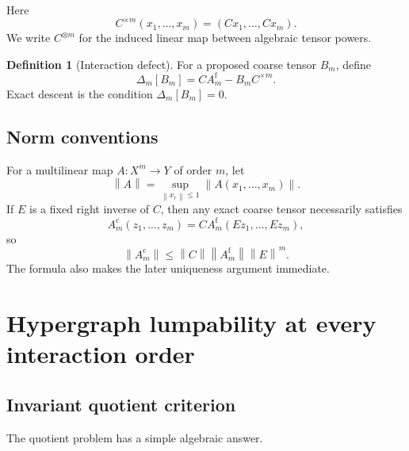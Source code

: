 \documentclass[11pt]{article}
\theoremstyle{definition}
\newtheorem{definition}[theorem]{Definition}
\theoremstyle{remark}
\newcommand{\norm}[1]{\left\lVert #1\right\rVert}
\newcommand{\fine}{\mathrm f}
\newcommand{\coarse}{\mathrm c}
\begin{document}
Here
\[
  C^{\times m}(x_1,\ldots,x_m)
  =(Cx_1,\ldots,Cx_m).
\]
We write $C^{\otimes m}$ for the induced linear map between algebraic tensor powers.

\begin{definition}[Interaction defect]\label{def:interaction-defect}
For a proposed coarse tensor $B_m$, define
\begin{equation}\label{eq:interaction-defect}
  \Delta_m[B_m]
  =
  CA_m^{\fine}-B_mC^{\times m}.
\end{equation}
Exact descent is the condition $\Delta_m[B_m]=0$.
\end{definition}

\subsection{Norm conventions}
For a multilinear map $A:X^m\to Y$ of order $m$, let
\[
  \norm{A}
  =
  \sup_{\norm{x_r}\leq1}
  \norm{A(x_1,\ldots,x_m)}.
\]
If $E$ is a fixed right inverse of $C$, then any exact coarse tensor necessarily satisfies
\begin{equation}\label{eq:coarse-tensor-bound-preview}
  A_m^{\coarse}(z_1,\ldots,z_m)
  =
  CA_m^{\fine}(Ez_1,\ldots,Ez_m),
\end{equation}
so
\[
  \norm{A_m^{\coarse}}
  \leq
  \norm{C}\norm{A_m^{\fine}}\norm{E}^m.
\]
The formula also makes the later uniqueness argument immediate.

\section{Hypergraph lumpability at every interaction order}\label{sec:allarity}

\subsection{Invariant quotient criterion}
The quotient problem has a simple algebraic answer.
\end{document}
